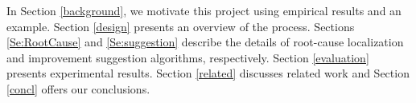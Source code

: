 In Section \ref{background}, we motivate this project using empirical results and an example.
Section \ref{design} presents an overview of the
process. Sections \ref{Se:RootCause} and \ref{Se:suggestion} describe the details of root-cause
localization and improvement suggestion algorithms, respectively.
Section \ref{evaluation} presents experimental results. Section \ref{related}
discusses related work and Section \ref{concl} offers our conclusions.

\begin{comment}
Automated software tools play an important role in improving the quality of real-world software applications, which aim to detect security vulnerabilities, find bugs, and support program understanding, etc. Static program analysis, approximating the program's behavior without executing the program, is essential for many automated tools. 

The effectiveness of a static analysis, which often is evaluated as a combination of its precision and performance, determines the usefulness of the software tool. A useful static analysis tool needs to achieve a good balance between precision (e.g., low false positive rate) and performance (e.g., completing the analysis under a limited time/space budget). Unfortunately, it is difficult to design effective static analysis techniques due to the challenges of accurately approximating the behavior of specific language features. A dynamic programming language such as JavaScript is often associated with several challenging features. For example, JavaScript allows program constructs to generate code at runtime and supports object property accesses as associative arrays. Therefore, despite the progress on improving the state-of-the-art (e.g., \cite{Sridharan:2012:CTP:2367163.2367191,DBLP:conf/ecoop/WeiR14,Andreasen:2014:DSA:2660193.2660214,DBLP:conf/ecoop/ParkR15}), static analysis still experiences performance and precision problems when analyzing real-world websites that use JavaScript libraries (e.g., {\it jQuery}).


\end{comment}
